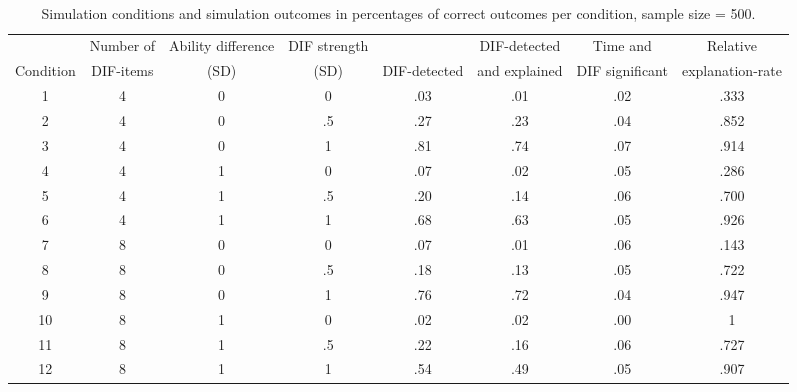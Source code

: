 \documentclass{interact}
\begin{document}
\begin{landscape}
\pagestyle{empty}
\begin{table}[p]

\caption{\label{tab:sim_500}\\ Simulation conditions and simulation outcomes in percentages of correct outcomes per condition, sample size = 500.}
\begin{tabular}{c| c c c | c c c c}
\hline
\hline
     & Number of & Ability difference & DIF strength &  & DIF-detected & Time and & Relative\\
    Condition & DIF-items & (SD) & (SD) & DIF-detected & and explained & DIF significant & explanation-rate\\
    \hline
    1 & 4 & 0 & 0 & .03 & .01 & .02 & .333 \\
    2 & 4 & 0 & .5 & .27 & .23 & .04 & .852 \\
    3 & 4 & 0 & 1 & .81 & .74 & .07 & .914 \\
    4 & 4 & 1 & 0 & .07 & .02 & .05 & .286 \\
    5 & 4 & 1 & .5 & .20 & .14 & .06 & .700\\
    6 & 4 & 1 & 1 & .68 & .63 & .05 & .926 \\
    7 & 8 & 0 & 0 & .07 & .01 & .06 & .143 \\
    8 & 8 & 0 & .5 & .18 & .13 & .05 & .722 \\
    9 & 8 & 0 & 1 & .76 & .72 & .04 & .947 \\
    10 & 8 & 1 & 0 & .02 & .02 & .00 & 1\\
    11 & 8 & 1 & .5 & .22 & .16 & .06 & .727 \\
    12 & 8 & 1 & 1 & .54 & .49 & .05 & .907 \\
    \hline
    \hline
\end{tabular}

\end{table} 

\end{landscape}
\pagestyle{plain}
\end{document}
